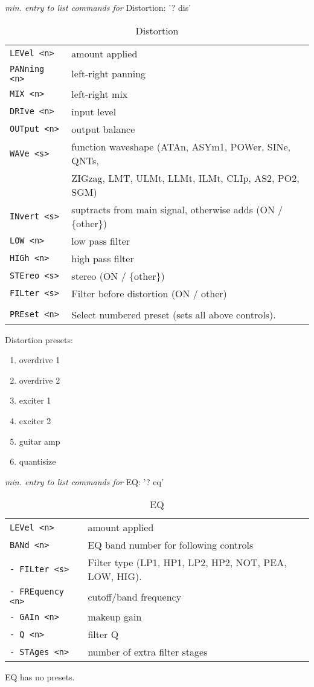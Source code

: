 \pagebreak
   \textsl{min. entry to list commands for} Distortion:  '? dis'
   \begin{table}[H]
      \centering
      \caption{Distortion}
      \begin{tabular}{l l}
\texttt{LEVel <n>} &
   amount applied \\
\texttt{PANning <n>} &
   left-right panning \\
\texttt{MIX <n>} &
   left-right mix \\
\texttt{DRIve <n>} &
   input level \\
\texttt{OUTput <n>} &
   output balance \\
\texttt{WAVe <s>} &
   function waveshape (ATAn, ASYm1, POWer, SINe, QNTs,\\
\texttt{ } &
    ZIGzag, LMT, ULMt, LLMt, ILMt, CLIp, AS2, PO2, SGM) \\
\texttt{INvert <s>} &
   suptracts from main signal, otherwise adds (ON / \{other\}) \\
\texttt{LOW <n>} &
   low pass filter \\
\texttt{HIGh <n>} &
   high pass filter \\
\texttt{STEreo <s>} &
   stereo (ON / \{other\}) \\
\texttt{FILter <s>} &
   Filter before distortion (ON / other) \\
\texttt{} & \\ %
\texttt{PREset <n>} &
   Select numbered preset (sets all above controls). \\
      \end{tabular}
   \end{table}
Distortion presets:
   \begin{enumerate}
   \item overdrive 1
   \item overdrive 2
   \item exciter 1
   \item exciter 2
   \item guitar amp
   \item quantisize
   \end{enumerate}

   \textsl{min. entry to list commands for} EQ:  '? eq'
   \begin{table}[H]
      \centering
      \caption{EQ}
      \begin{tabular}{l l}
\texttt{LEVel <n>} &
   amount applied \\
\texttt{BANd <n>} &
   EQ band number for following controls \\
\texttt{- FILter <s>} &
   Filter type (LP1, HP1, LP2, HP2, NOT, PEA, LOW, HIG). \\
\texttt{- FREquency <n>} &
   cutoff/band frequency \\
\texttt{- GAIn <n>} &
   makeup gain \\
\texttt{- Q <n>} &
   filter Q \\
\texttt{- STAges <n>} &
   number of extra filter stages \\
      \end{tabular}
   \end{table}
EQ has no presets.

